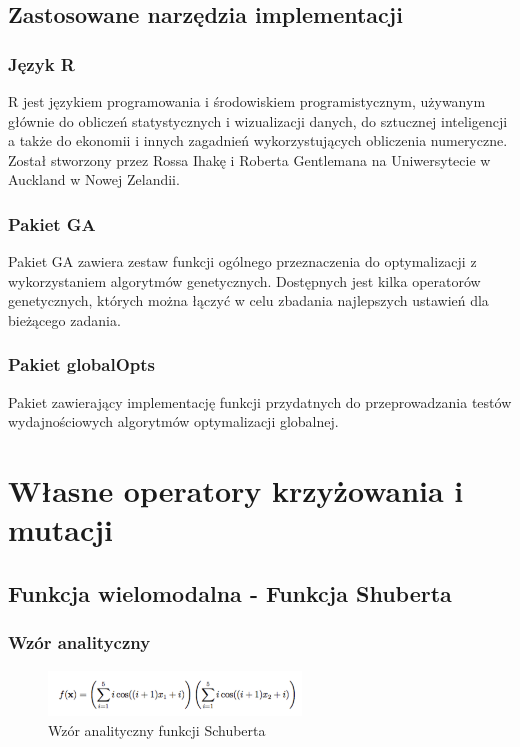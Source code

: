 \documentclass{article}
\begin{document}
\subsection{Zastosowane narzędzia implementacji}

\subsubsection{Język R}
R jest językiem programowania i środowiskiem programistycznym, używanym głównie do obliczeń statystycznych i wizualizacji danych, do sztucznej inteligencji a także do ekonomii i innych zagadnień wykorzystujących obliczenia numeryczne. Został stworzony przez Rossa Ihakę i Roberta Gentlemana na Uniwersytecie w Auckland w Nowej Zelandii. 


\subsubsection{Pakiet GA}

Pakiet GA zawiera zestaw funkcji ogólnego przeznaczenia do optymalizacji z wykorzystaniem algorytmów genetycznych. Dostępnych jest kilka operatorów genetycznych, których można łączyć w celu zbadania najlepszych ustawień dla bieżącego zadania.


\subsubsection{Pakiet globalOpts}
Pakiet zawierający implementację funkcji przydatnych do przeprowadzania testów wydajnościowych algorytmów optymalizacji globalnej.

\newpage
\section{Własne operatory krzyżowania i mutacji}
\subsection{Funkcja wielomodalna - Funkcja Shuberta}
	\subsubsection{Wzór analityczny}
	   \begin{figure}[!htbp]
    \centering
    \includegraphics[width=0.6\textwidth]{inc/wzory/schubert}
     \caption{Wzór analityczny funkcji Schuberta}
    \end{figure}
    
\end{document}
